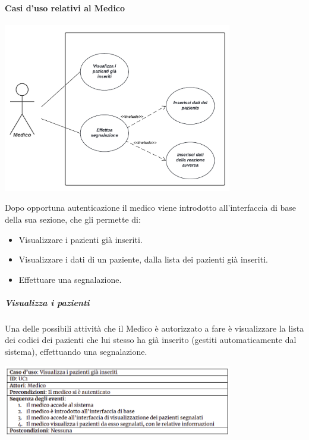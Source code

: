 \documentclass{article}
\begin{document}
    \paragraph*{Casi d'uso relativi al Medico}
        \begin{center}
            \includegraphics[width=0.75\textwidth]{pictures/CasoDUsoMedico.png}
    \end{center}
    Dopo opportuna autenticazione il medico viene introdotto all'interfaccia di base della sua sezione, che gli permette di:
        \begin{itemize}
            \item Visualizzare i pazienti già inseriti.
            \item Visualizzare i dati di un paziente, dalla lista dei pazienti già inseriti.
            \item Effettuare una segnalazione.
        \end{itemize}
        \subparagraph*{Visualizza i pazienti}
        Una delle possibili attività che il Medico è autorizzato a fare è visualizzare la lista dei codici dei pazienti che lui stesso ha già inserito (gestiti automaticamente dal sistema), effettuando una segnalazione.
            \begin{center}
                \includegraphics[width=0.75\textwidth]{pictures/UC1.png}
        \end{center}
\end{document}
